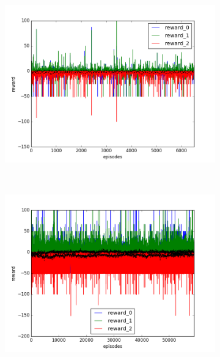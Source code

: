 \begin{figure}[t]
  \vspace{\graphspacing}
  \begin{subfigure}[t]{\figscale\linewidth}
    \hspace*{-2.75cm}
    \includegraphics[width=1.5\textwidth]
    {../results/dqn_1vs2/reward.png}
    \label{fig:dqn-1vs2-reward}
  \end{subfigure}
  ~
  \begin{subfigure}[t]{\figscale\linewidth}
    \hspace*{-1.4cm}
    \includegraphics[width=1.5\textwidth]
    {../results/ddpg_1vs2/reward.png}
    \label{fig:ddpg-1vs2-reward}
  \end{subfigure}
  ~
  \begin{subfigure}[t]{\figscale\linewidth}

\end{subfigure}
\end{figure}
